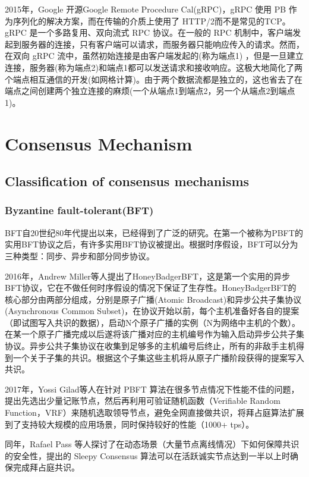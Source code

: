 \documentclass[a4paper,twoside]{scrbook}
\begin{document}
\begin{CJK}{UTF8}{gbsn}
2015年，Google 开源Google Remote Procedure Cal(gRPC)，gRPC 使用 PB 作为序列化的解决方案，而在传输的介质上使用了 HTTP/2而不是常见的TCP。gRPC 是一个多路复用、双向流式 RPC 协议。在一般的 RPC 机制中，客户端发起到服务器的连接，只有客户端可以请求，而服务器只能响应传入的请求。然而，在双向 gRPC 流中，虽然初始连接是由客户端发起的(称为端点1) ，但是一旦建立连接，服务器(称为端点2)和端点1都可以发送请求和接收响应。这极大地简化了两个端点相互通信的开发(如网格计算)。由于两个数据流都是独立的，这也省去了在端点之间创建两个独立连接的麻烦(一个从端点1到端点2，另一个从端点2到端点1)。

\section{Consensus Mechanism}
\subsection{Classification of consensus mechanisms}
\subsubsection{Byzantine fault-tolerant(BFT)}
BFT自20世纪80年代提出以来\cite{lamport1982byzantine}，已经得到了广泛的研究。在第一个被称为PBFT\cite{castro2002practical}的实用BFT协议之后，有许多实用BFT协议被提出。根据时序假设，BFT可以分为三种类型：同步、异步和部分同步协议。

2016年，Andrew Miller等人提出了HoneyBadgerBFT\cite{miller2016honey}，这是第一个实用的异步BFT协议，它在不做任何时序假设的情况下保证了生存性。HoneyBadgerBFT的核心部分由两部分组成，分别是原子广播(Atomic Broadcast)和异步公共子集协议(Asynchronous Common Subset)，在协议开始以前，每个主机准备好各自的提案（即试图写入共识的数据），启动N个原子广播的实例（N为网络中主机的个数）。在某一个原子广播完成以后遂将该广播对应的主机编号作为输入启动异步公共子集协议。异步公共子集协议在收集到足够多的主机编号后终止，所有的非敌手主机得到一个关于子集的共识。根据这个子集这些主机将从原子广播阶段获得的提案写入共识。

2017年，Yossi Gilad\cite{gilad2017algorand}等人在针对 PBFT 算法在很多节点情况下性能不佳的问题，提出先选出少量记账节点，然后再利用可验证随机函数（Verifiable Random Function，VRF）来随机选取领导节点，避免全网直接做共识，将拜占庭算法扩展到了支持较大规模的应用场景，同时保持较好的性能（1000+ tps）。

同年，Rafael Pass \cite{pass2017sleepy}等人探讨了在动态场景（大量节点离线情况）下如何保障共识的安全性，提出的 Sleepy Consensus 算法可以在活跃诚实节点达到一半以上时确保完成拜占庭共识。


\end{CJK}
\end{document}
